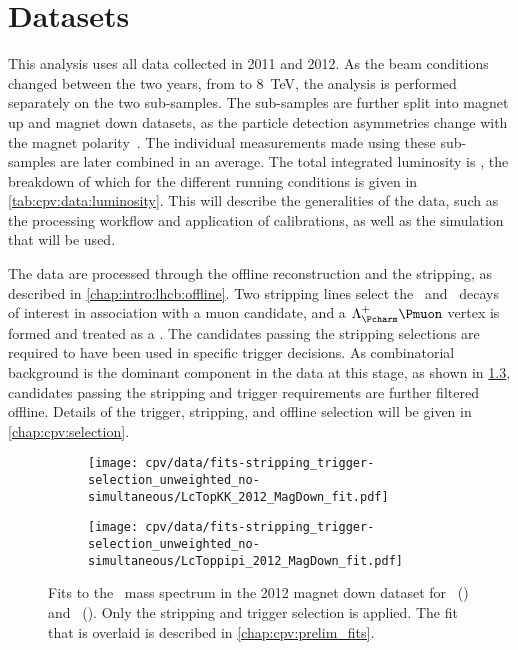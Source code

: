 \chapter{Datasets}
\label{chap:cpv:data}

This analysis uses all data collected in 2011 and 2012.
As the beam conditions changed between the two years, from  to 
\SI{8}{\TeV}, the analysis is performed separately on the two sub-samples.
The sub-samples are further split into magnet up and magnet down datasets, as 
the particle detection asymmetries change with the magnet 
polarity~\cite{Vesterinen:1642153}.
The individual measurements made using these sub-samples are later combined in 
an average.
The total integrated luminosity is \totlumi, the breakdown of which for the 
different running conditions is given in \cref{tab:cpv:data:luminosity}.
This  will describe the generalities of the data, 
such as the processing workflow and application of calibrations, as well as the 
simulation that will be used.

The data are processed through the offline reconstruction and the stripping, as 
described in \cref{chap:intro:lhcb:offline}.
Two stripping lines select the \LcTopKK\ and \LcToppipi\ decays of interest in 
association with a muon candidate, and a $\PLambdac\Pmuon$ vertex is formed and 
treated as a \PLambdab.
The candidates passing the stripping selections are required to have been used 
in specific trigger decisions.
As combinatorial background is the dominant component in the data at this 
stage, as shown in \cref{fig:cpv:data:mass}, candidates passing the stripping 
and trigger requirements are further filtered offline.
Details of the trigger, stripping, and offline selection will be given in 
\cref{chap:cpv:selection}.

\begin{figure}
  \begin{subfigure}[b]{0.5\textwidth}
    \texttt{[image: cpv/data/fits-stripping\_trigger-selection\_unweighted\_no-simultaneous/LcTopKK\_2012\_MagDown\_fit.pdf]}
    \caption{\pKK}
    \label{fig:cpv:data:mass:pKK}
  \end{subfigure}
  \begin{subfigure}[b]{0.5\textwidth}
    \texttt{[image: cpv/data/fits-stripping\_trigger-selection\_unweighted\_no-simultaneous/LcToppipi\_2012\_MagDown\_fit.pdf]}
    \caption{\ppipi}
    \label{fig:cpv:data:mass:ppipi}
  \end{subfigure}
  \caption{%
    Fits to the \PLambdac\ mass spectrum in the 2012 magnet down dataset for 
    \pKK\ () and \ppipi\ 
    ().
    Only the stripping and trigger selection is applied.
    The fit that is overlaid is described in \cref{chap:cpv:prelim_fits}.
  }
  \label{fig:cpv:data:mass}
\end{figure}


